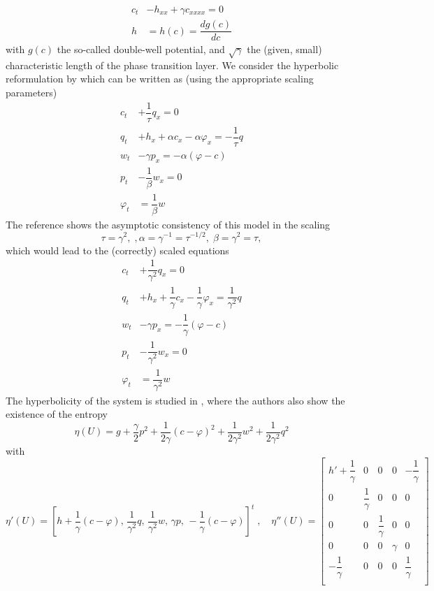\documentclass{article}
\theoremstyle{plain}
\theoremstyle{definition}
\numberwithin{theorem}{section}
\begin{document}
\begin{subequations} \label{CaHi}
\begin{align}
c_t  & -  h_{xx} +\gamma c_{xxxx} =0\\
h &=h(c) = \dfrac{dg(c)}{dc}
\end{align}
\end{subequations}
with $g(c)$ the so-called  double-well potential, and $\sqrt{\gamma}$   the (given, small) characteristic length of  the phase transition layer.
We consider the hyperbolic reformulation by \cite{dhaouadi25} which can be written as (using the appropriate scaling parameters)
\begin{subequations} \label{hCaHi}
\begin{align}
c_t  &  +\dfrac{1}{\tau} q_x =0\\
q_t  &  + h_x +\alpha c_x- \alpha\varphi_x = - \dfrac{1}{\tau} q\\
w_t  &  -  \gamma p_x =  -\alpha (\varphi-c)\\
p_t  &  -   \dfrac{1}{\beta} w_x =0\\
\varphi_t &  =   \dfrac{1}{\beta} w
\end{align}
\end{subequations}
The reference shows the asymptotic consistency of this model in the scaling
$$\tau = \gamma^2,\;, \alpha=\gamma^{-1} = \tau^{-1/2},\; \beta =\gamma^2 = \tau,$$
which would lead to  the  (correctly) scaled equations
\begin{subequations} \label{hCaHi1}
\begin{align}
c_t  &  +\dfrac{1}{\gamma^2} q_x =0\\
q_t  &  + h_x +\dfrac{1}{\gamma} c_x- \dfrac{1}{\gamma}\varphi_x =  \dfrac{1}{\gamma^2} q\\
w_t  &  -  \gamma p_x = - \dfrac{1}{\gamma} (\varphi-c)\\
p_t  &  -   \dfrac{1}{\gamma^2} w_x =0\\
\varphi_t &  =   \dfrac{1}{\gamma^2} w
\end{align}
\end{subequations}
The hyperbolicity of the system is studied in \cite{dhaouadi25}, where the authors also show the existence of the entropy
$$
\eta(U) = g +\dfrac{\gamma}{2}p^2 + \dfrac{1}{2\gamma } (c-\varphi)^2  + \dfrac{1}{2\gamma^2}w^2 +  \dfrac{1}{2\gamma^2}q^2
$$
with
$$
\eta'(U)= [h+ \dfrac{1}{\gamma } (c-\varphi),\,  \dfrac{1}{\gamma^2 }q,\,  \dfrac{1}{\gamma^2 }w,\, \gamma p,\,    -\dfrac{1}{\gamma } (c-\varphi) ]^t\;,\quad
\eta''(U) =   \left[\begin{array}{ccccc}
h' +\dfrac{1}{\gamma} &0&0&0&-\dfrac{1}{\gamma} \\
0 & \dfrac{1}{\gamma} &0&0&0\\
0 & 0&\dfrac{1}{\gamma} &0&0\\
0 & 0&0& \gamma &0\\
-\dfrac{1}{\gamma} & 0&0& 0 &\dfrac{1}{\gamma} \\
\end{array}
\right]
$$
\end{document}
